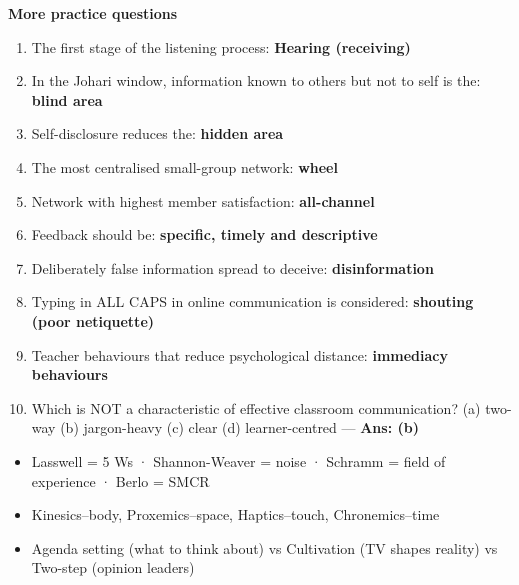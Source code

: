 \textbf{More practice questions}

\begin{enumerate}
\def\labelenumi{\arabic{enumi}.}
\setcounter{enumi}{22}
\tightlist
\item
  The first stage of the listening process: \textbf{Hearing (receiving)}
\item
  In the Johari window, information known to others but not to self is the: \textbf{blind area}
\item
  Self-disclosure reduces the: \textbf{hidden area}
\item
  The most centralised small-group network: \textbf{wheel}
\item
  Network with highest member satisfaction: \textbf{all-channel}
\item
  Feedback should be: \textbf{specific, timely and descriptive}
\item
  Deliberately false information spread to deceive: \textbf{disinformation}
\item
  Typing in ALL CAPS in online communication is considered: \textbf{shouting (poor netiquette)}
\item
  Teacher behaviours that reduce psychological distance: \textbf{immediacy behaviours}
\item
  Which is NOT a characteristic of effective classroom communication? (a) two-way (b) jargon-heavy (c) clear (d) learner-centred --- \textbf{Ans: (b)}
\end{enumerate}

\begin{revbox}

\begin{itemize}
\tightlist
\item
  Lasswell = 5 Ws · Shannon-Weaver = noise · Schramm = field of experience · Berlo = SMCR
\item
  Kinesics--body, Proxemics--space, Haptics--touch, Chronemics--time
\item
  Agenda setting (what to think about) vs Cultivation (TV shapes reality) vs Two-step (opinion leaders)
\end{itemize}

\end{revbox}
